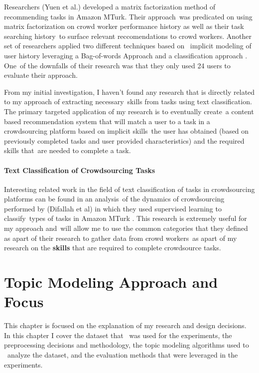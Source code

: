 \documentclass[letterpaper,12pt]{article}
\begin{document}
Researchers (Yuen et al.) developed a matrix factorization method of recommending tasks in Amazon MTurk. \cite{yuen2012task} Their approach\
was predicated on using matrix factorization on crowd worker performance history as well as their task searching history\
to surface relevant reccomendations to crowd workers. Another set of researchers applied two different techniques based on \
implicit modeling of user history leveraging a Bag-of-words Approach and a classification approach \cite{ambati2011towards}. One\
of the downfalls of their research was that they only used 24 users to evaluate their approach.

From my initial investigation, I haven't found any research that is directly related to my approach of extracting necessary\
skills from tasks using text classification. The primary targeted application of my research is to eventually create\
a content based recommendation system that will match a user to a task in a crowdsourcing platform based on implicit skills\
the user has obtained (based on previously completed tasks and user provided characteristics) and the required skills that\
are needed to complete a task.

\subsubsection{Text Classification of Crowdsourcing Tasks}
Interesting related work in the field of text classification of tasks in crowdsourcing platforms can be found in an analysis\
of the dynamics of crowdsourcing performed by (Difallah et al) in which they used supervised learning to classify\
types of tasks in Amazon MTurk \cite{difallah2015dynamics}. This research is extremely useful for my approach and\
will allow me to use the common categories that they defined as apart of their research to gather data from crowd workers\
as apart of my research on the \textbf{skills} that are required to complete crowdsource tasks.

\chapter{Topic Modeling Approach and Focus}
This chapter is focused on the explanation of my research and design decisions. In this chapter I cover the dataset that \
was used for the experiments, the preprocessing decisions and methodology, the topic modeling algorithms used to \
analyze the dataset, and the evaluation methods that were leveraged in the experiments.
\end{document}

